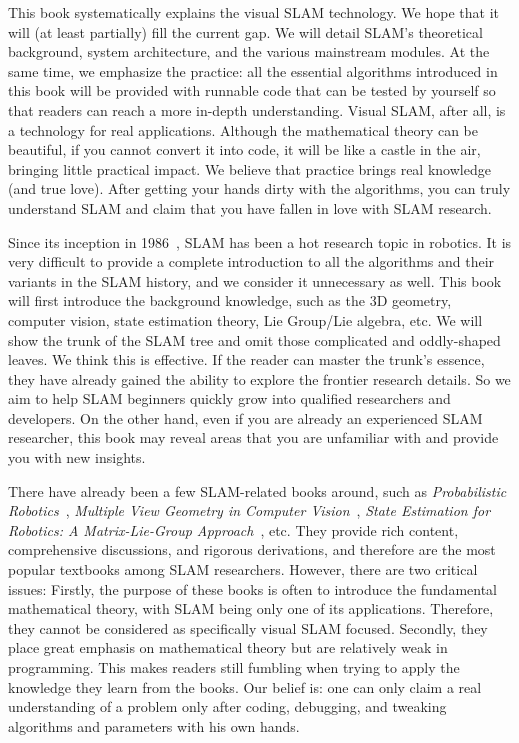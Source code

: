 This book systematically explains the visual SLAM technology. We hope that it will (at least partially) fill the current gap. We will detail SLAM's theoretical background, system architecture, and the various mainstream modules. At the same time, we emphasize the practice: all the essential algorithms introduced in this book will be provided with runnable code that can be tested by yourself so that readers can reach a more in-depth understanding. Visual SLAM, after all, is a technology for real applications. Although the mathematical theory can be beautiful, if you cannot convert it into code, it will be like a castle in the air, bringing little practical impact. We believe that practice brings real knowledge (and true love). After getting your hands dirty with the algorithms, you can truly understand SLAM and claim that you have fallen in love with SLAM research.

Since its inception in 1986~\cite{Smith1986}, SLAM has been a hot research topic in robotics. It is very difficult to provide a complete introduction to all the algorithms and their variants in the SLAM history, and we consider it unnecessary as well. This book will first introduce the background knowledge, such as the 3D geometry, computer vision, state estimation theory, Lie Group/Lie algebra, etc. We will show the trunk of the SLAM tree and omit those complicated and oddly-shaped leaves. We think this is effective. If the reader can master the trunk's essence, they have already gained the ability to explore the frontier research details. So we aim to help SLAM beginners quickly grow into qualified researchers and developers. On the other hand, even if you are already an experienced SLAM researcher, this book may reveal areas that you are unfamiliar with and provide you with new insights.

There have already been a few SLAM-related books around, such as \textit{Probabilistic Robotics}~\cite{Thrun2005}, \textit{Multiple View Geometry in Computer Vision}~\cite{Hartley2003}, \textit{State Estimation for Robotics: A Matrix-Lie-Group Approach}~\cite{Barfoot2016}, etc. They provide rich content, comprehensive discussions, and rigorous derivations, and therefore are the most popular textbooks among SLAM researchers. However,  there are two critical issues: Firstly, the purpose of these books is often to introduce the fundamental mathematical theory, with SLAM being only one of its applications. Therefore, they cannot be considered as specifically visual SLAM focused. Secondly, they place great emphasis on mathematical theory but are relatively weak in programming. This makes readers still fumbling when trying to apply the knowledge they learn from the books. Our belief is: one can only claim a real understanding of a problem only after coding, debugging, and tweaking algorithms and parameters with his own hands.

